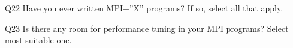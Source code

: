 \begin{description}%
\item{Q22} Have you ever written MPI+”X” programs? If so, select all that apply.%
\item{Q23} Is there any room for performance tuning in your MPI programs? Select most suitable one.%
\end{description}%
